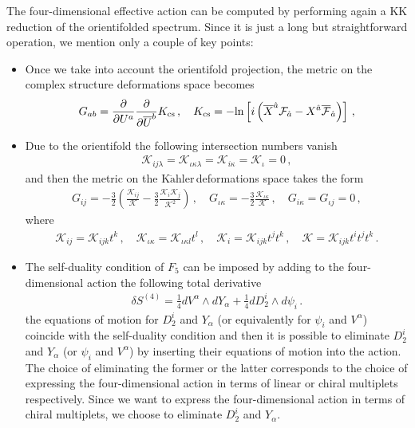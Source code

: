 \documentclass[12pt,a4paper]{book}
\newcommand{\Kahler}{\ensuremath{\text{K}\ddot{\text{a}}\text{hler}\,}}
\begin{document}
The four-dimensional effective action can be computed by performing again a KK reduction of the orientifolded spectrum. Since it is just a long but straightforward operation, we mention only a couple of key points:
\begin{itemize}
\item Once we take into account the orientifold projection, the metric on the complex structure deformations space becomes
\begin{align}
\label{eq:OrientifoldedComplexStructureMetric}
G_{ab} = \frac{\partial}{\partial U^a} \frac{\partial}{\partial \overline{U}^b} K_{\rm cs} \,, \quad K_{\rm cs} = - \text{ln} \left[i\left(\overline{X}^{\hat{a}} \mathcal{F}_{\hat{a}} - X^{\hat{a}} \overline{\mathcal{F}}_{\hat{a}}\right)\right] \,,
\end{align}
\item Due to the orientifold the following intersection numbers vanish
\begin{align}
\label{eq:VanishingIntersectionNumbersOrientifold}
\mathcal{K}_{ij \lambda} = \mathcal{K}_{\iota \kappa \lambda} = \mathcal{K}_{i \kappa} = \mathcal{K}_{\iota} = 0\,,
\end{align}
and then the metric on the \Kahler deformations space takes the form
\begin{align}
\label{eq:OrientifoldedKahlerMetric}
G_{ij} = -\frac{3}{2} \left(\frac{\mathcal{K}_{ij}}{\mathcal{K}} - \frac{3}{2} \frac{\mathcal{K}_i \mathcal{K}_j}{\mathcal{K}^2}\right) \,, \quad G_{\iota \kappa} = -\frac{3}{2} \frac{\mathcal{K}_{\iota \kappa}}{\mathcal{K}} \,, \quad G_{i \kappa} = G_{\iota j} = 0 \,,
\end{align}
where
\begin{align}
\label{eq:NonVanishingOrientifoldedIntersectionNumbers}
\mathcal{K}_{ij} = \mathcal{K}_{ijk} t^k \,, \quad \mathcal{K}_{\iota \kappa} = \mathcal{K}_{\iota \kappa l} t^l\,, \quad \mathcal{K}_{i} = \mathcal{K}_{ijk} t^j t^k \,, \quad \mathcal{K} = \mathcal{K}_{ijk} t^i t^j t^k \,.
\end{align}
\item The self-duality condition of $F_5$ can be imposed by adding to the four-dimensional action the following total derivative
\begin{align}
\label{eq:TotalDerivative}
\delta S^{(4)} = \frac{1}{4} dV^\alpha \wedge dY_\alpha + \frac{1}{4} dD_2^i \wedge d\psi_i\,.
\end{align}
the equations of motion for $D_2^i$ and $Y_\alpha$ (or equivalently for $\psi_i$ and $V^\alpha$) coincide with the self-duality condition and then it is possible to eliminate $D_2^i$ and $Y_\alpha$ (or $\psi_i$ and $V^\alpha$) by inserting their equations of motion into the action. The choice of eliminating the former or the latter corresponds to the choice of expressing the four-dimensional action in terms of linear or chiral multiplets respectively. Since we want to express the four-dimensional action in terms of chiral multiplets, we choose to eliminate $D^i_2$ and $Y_\alpha$.
\end{itemize}
\end{document}
